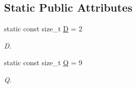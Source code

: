 \subsection*{Static Public Attributes}
\begin{DoxyCompactItemize}
\item 
\hypertarget{classnatrium_1_1D2Q9_ac7789c0c9afd78b1caed4cf9fd82412c}{
static const size\_\-t \hyperlink{classnatrium_1_1D2Q9_ac7789c0c9afd78b1caed4cf9fd82412c}{D} = 2}
\label{classnatrium_1_1D2Q9_ac7789c0c9afd78b1caed4cf9fd82412c}

\begin{DoxyCompactList}\small\item\em D. \item\end{DoxyCompactList}\item 
\hypertarget{classnatrium_1_1D2Q9_a88aa9e944146e26d2c879bfe3f72e4da}{
static const size\_\-t \hyperlink{classnatrium_1_1D2Q9_a88aa9e944146e26d2c879bfe3f72e4da}{Q} = 9}
\label{classnatrium_1_1D2Q9_a88aa9e944146e26d2c879bfe3f72e4da}

\begin{DoxyCompactList}\small\item\em Q. \item\end{DoxyCompactList}\end{DoxyCompactItemize}
